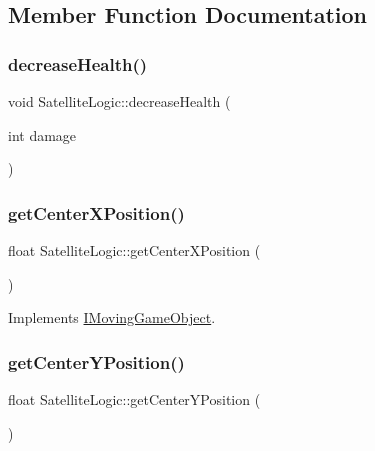\subsection{Member Function Documentation}
\mbox{\label{class_satellite_logic_ab026cc80cbd0f9f1b6e4970f121c6b7f}} 
\subsubsection{\texorpdfstring{decrease\+Health()}{decreaseHealth()}}
{\footnotesize\ttfamily void Satellite\+Logic\+::decrease\+Health (\begin{DoxyParamCaption}\item[{int}]{damage }\end{DoxyParamCaption})}

\mbox{\label{class_satellite_logic_aa6e4c41fc34adaf4ef7861a6a3785226}} 
\subsubsection{\texorpdfstring{get\+Center\+X\+Position()}{getCenterXPosition()}}
{\footnotesize\ttfamily float Satellite\+Logic\+::get\+Center\+X\+Position (\begin{DoxyParamCaption}{ }\end{DoxyParamCaption})\hspace{0.3cm}{\ttfamily [virtual]}}



Implements \hyperlink{class_i_moving_game_object_ae4e6c21094ef1e2db32729270c8a7999}{I\+Moving\+Game\+Object}.

\mbox{\label{class_satellite_logic_a416fb2cabc7fcc003cbe04da68dac7c3}} 
\subsubsection{\texorpdfstring{get\+Center\+Y\+Position()}{getCenterYPosition()}}
{\footnotesize\ttfamily float Satellite\+Logic\+::get\+Center\+Y\+Position (\begin{DoxyParamCaption}{ }\end{DoxyParamCaption})\hspace{0.3cm}{\ttfamily [virtual]}}



